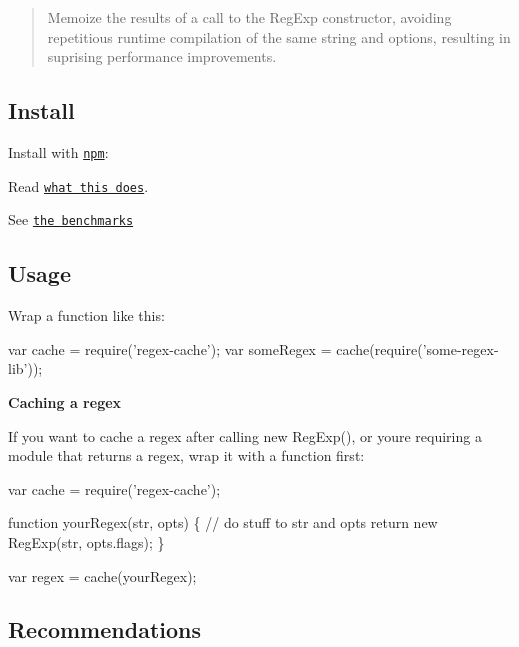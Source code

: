 \begin{quote}
Memoize the results of a call to the Reg\+Exp constructor, avoiding repetitious runtime compilation of the same string and options, resulting in suprising performance improvements. \end{quote}


\subsection*{Install}

Install with \href{https://www.npmjs.com/}{\tt npm}\+:





\begin{DoxyItemize}
\item Read \href{#what-this-does}{\tt what this does}.
\item See \href{#benchmarks}{\tt the benchmarks}
\end{DoxyItemize}

\subsection*{Usage}

Wrap a function like this\+:


\begin{DoxyCode}
var cache = require('regex-cache');
var someRegex = cache(require('some-regex-lib'));
\end{DoxyCode}


{\bfseries Caching a regex}

If you want to cache a regex after calling {\ttfamily new Reg\+Exp()}, or you\textquotesingle{}re requiring a module that returns a regex, wrap it with a function first\+:


\begin{DoxyCode}
var cache = require('regex-cache');

function yourRegex(str, opts) \{
  // do stuff to str and opts
  return new RegExp(str, opts.flags);
\}

var regex = cache(yourRegex);
\end{DoxyCode}


\subsection*{Recommendations}

